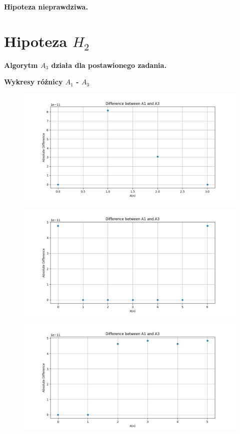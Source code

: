 \documentclass{article}
\begin{document}
\textbf{Hipoteza nieprawdziwa.} 

\clearpage

\section{Hipoteza $H_2$}

\textbf{Algorytm $A_3$ działa dla postawionego zadania.}

\hspace{}

\textbf{Wykresy różnicy $A_1$ - $A_3$}

\begin{figure}[ht!]
    \centering
    \includegraphics[width=1\linewidth]{h2_plot_1.jpg}
    \label{fig:my_label}
\end{figure}


\begin{figure}[ht!]
    \centering
    \includegraphics[width=1\linewidth]{h2_plot_2.jpg}
    \label{fig:enter-label}
\end{figure}

\begin{figure}
    \centering
    \includegraphics[width=1\linewidth]{h2_plot_3.jpg}
    \label{fig:enter-label}
\end{figure}
\end{document}
